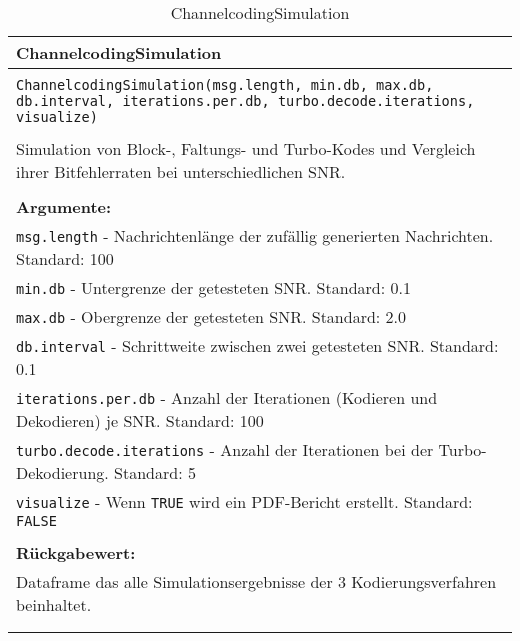 \begin{longtable}{|p{\textwidth}|}
\hline
\rowcolor{lightblue}
ChannelcodingSimulation
\\
\hline
\\
\texttt{ChannelcodingSimulation(msg.length, min.db, max.db, db.interval, iterations.per.db, turbo.decode.iterations, visualize)}\\
\\
Simulation von Block-, Faltungs- und Turbo-Kodes und Vergleich ihrer Bitfehlerraten bei unterschiedlichen SNR.\\
\\
\textbf{Argumente:}\\
\texttt{msg.length} - Nachrichtenlänge der zufällig generierten Nachrichten. Standard: 100\\
\texttt{min.db} - Untergrenze der getesteten SNR. Standard: 0.1\\
\texttt{max.db} - Obergrenze der getesteten SNR. Standard: 2.0\\
\texttt{db.interval} - Schrittweite zwischen zwei getesteten SNR. Standard: 0.1\\
\texttt{iterations.per.db} - Anzahl der Iterationen (Kodieren und Dekodieren) je SNR. Standard: 100\\
\texttt{turbo.decode.iterations} - Anzahl der Iterationen bei der Turbo-Dekodierung. Standard: 5\\
\texttt{visualize} - Wenn \texttt{TRUE} wird ein PDF-Bericht erstellt. Standard: \texttt{FALSE}\\
\\
\textbf{Rückgabewert:}\\
Dataframe das alle Simulationsergebnisse der 3 Kodierungsverfahren beinhaltet.\\
\\
\hline
\caption{ChannelcodingSimulation}
\end{longtable}